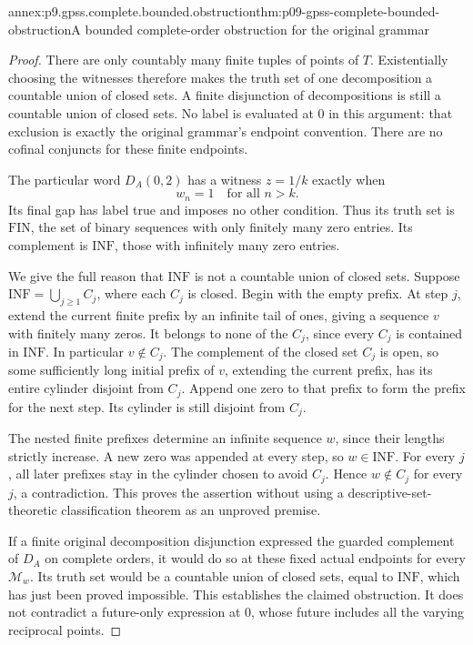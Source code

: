 \begin{annexitem}{annex:p9.gpss.complete.bounded.obstruction}{thm:p09-gpss-complete-bounded-obstruction}{A bounded complete-order obstruction for the original grammar}
\begin{proof}
There are only countably many finite tuples
of points of \(T\). Existentially choosing
the witnesses therefore makes the truth
set of one decomposition a countable
union of closed sets. A finite disjunction
of decompositions is still a countable
union of closed sets. No label is evaluated
at 0 in this argument: that exclusion
is exactly the original grammar's
endpoint convention. There are no
cofinal conjuncts for these finite
endpoints.

The particular word \(D_A(0,2)\) has a
witness \(z=1/k\) exactly when
\[
                         w_n=1\quad\text{for all }n>k.
\]
Its final gap has label true and imposes
no other condition. Thus its truth set
is \(\mathrm{FIN}\), the set of binary
sequences with only finitely many zero
entries. Its complement is
\(\mathrm{INF}\), those with infinitely
many zero entries.

We give the full reason that \(\mathrm{INF}\)
is not a countable union of closed sets.
Suppose \(\mathrm{INF}=\bigcup_{j\geq1}C_j\),
where each \(C_j\) is closed. Begin with
the empty prefix. At step \(j\), extend
the current finite prefix by an infinite
tail of ones, giving a sequence \(v\)
with finitely many zeros. It belongs
to none of the \(C_j\), since every
\(C_j\) is contained in \(\mathrm{INF}\).
In particular \(v\notin C_j\).
The complement of the closed set \(C_j\)
is open, so some sufficiently long
initial prefix of \(v\), extending
the current prefix, has its entire
cylinder disjoint from \(C_j\).
Append one zero to that prefix to
form the prefix for the next step.
Its cylinder is still disjoint from
\(C_j\).

The nested finite prefixes determine
an infinite sequence \(w\), since
their lengths strictly increase.
A new zero was appended at every
step, so \(w\in\mathrm{INF}\).
For every \(j\), all later prefixes
stay in the cylinder chosen to avoid
\(C_j\). Hence \(w\notin C_j\)
for every \(j\), a contradiction.
This proves the assertion without
using a descriptive-set-theoretic
classification theorem as an
unproved premise.

If a finite original decomposition
disjunction expressed the guarded
complement of \(D_A\) on complete
orders, it would do so at these
fixed actual endpoints for every
\(\mathcal M_w\). Its truth set
would be a countable union of
closed sets, equal to
\(\mathrm{INF}\), which has just
been proved impossible. This
establishes the claimed obstruction.
It does not contradict a
future-only expression at 0,
whose future includes all the
varying reciprocal points.
\end{proof}
\end{annexitem}

